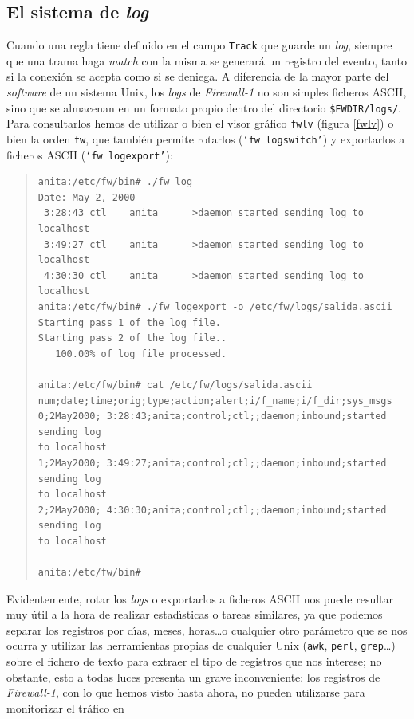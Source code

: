 \subsection{El sistema de {\it log}}
\label{fw1log}
Cuando una regla tiene definido en el campo {\tt Track} que guarde un {\it log},
siempre que una trama haga {\it match} con la misma se generar\'a un registro
del evento, tanto si la conexi\'on se acepta como si se deniega. A diferencia 
de la mayor parte del {\it software} de un sistema Unix, los {\it 
logs} de {\it Firewall-1} no son simples ficheros ASCII, sino que se almacenan
en un formato propio dentro del directorio {\tt \$FWDIR/logs/}. Para 
consultarlos hemos de utilizar o bien el visor gr\'afico {\tt fwlv} (figura
\ref{fwlv}) o bien la orden {\tt fw}, que tambi\'en permite rotarlos ({\tt `fw
logswitch'}) y exportarlos a ficheros ASCII ({\tt `fw logexport'}):
\begin{quote}
\begin{verbatim}
anita:/etc/fw/bin# ./fw log
Date: May 2, 2000
 3:28:43 ctl    anita      >daemon started sending log to localhost
 3:49:27 ctl    anita      >daemon started sending log to localhost
 4:30:30 ctl    anita      >daemon started sending log to localhost
anita:/etc/fw/bin# ./fw logexport -o /etc/fw/logs/salida.ascii
Starting pass 1 of the log file.
Starting pass 2 of the log file..
   100.00% of log file processed.

anita:/etc/fw/bin# cat /etc/fw/logs/salida.ascii
num;date;time;orig;type;action;alert;i/f_name;i/f_dir;sys_msgs
0;2May2000; 3:28:43;anita;control;ctl;;daemon;inbound;started sending log
to localhost
1;2May2000; 3:49:27;anita;control;ctl;;daemon;inbound;started sending log
to localhost
2;2May2000; 4:30:30;anita;control;ctl;;daemon;inbound;started sending log
to localhost

anita:/etc/fw/bin#
\end{verbatim}
\end{quote}
Evidentemente, rotar los {\it logs} o exportarlos a ficheros ASCII nos puede
resultar muy \'util a la hora de realizar estad\'{\i}sticas o tareas 
similares, ya que podemos
separar los registros por d\'{\i}as, meses, horas\ldots o cualquier otro 
par\'ametro que se nos ocurra y utilizar las herramientas propias de cualquier
Unix ({\tt awk}, {\tt perl}, {\tt grep}\ldots) sobre el fichero de texto para
extraer el tipo de registros que nos interese; no obstante, esto a todas luces
presenta un grave inconveniente: los registros de {\it Firewall-1}, con lo que
hemos visto hasta ahora, no pueden utilizarse para monitorizar el tr\'afico en 
